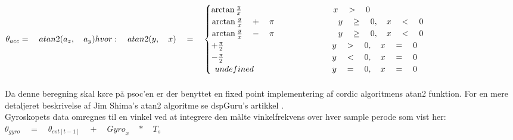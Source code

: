 	${ \theta  }_{ acc }=\quad atan2({ a }_{ z },\quad { a }_{ y })\\ \\ hvor:\quad atan2(y,\quad x)\quad =\quad \begin{cases} \begin{matrix} \arctan 
	{ \frac { y }{ x }  } \quad \quad \quad \quad \quad \quad \quad \quad \quad \quad \quad  \\ \arctan { \frac { y }{ x } \quad +\quad \pi  } \quad 
	\quad \quad \quad \quad \quad \quad  \\ \arctan { \frac { y }{ x } \quad -\quad \pi  } \quad \quad \quad \quad \quad \quad \quad  \end{matrix}
	\begin{matrix} x\quad >\quad 0\quad \quad \quad \quad \quad \quad \quad  \\ y\quad \ge \quad 0,\quad x\quad <\quad 0 \\ y\quad \ge \quad 0,\quad 
	x\quad <\quad 0 \end{matrix} \\ \begin{matrix} +\frac { \pi  }{ 2 } \quad \quad \quad \quad \quad \quad \quad \quad \quad \quad \quad \quad \quad  
	\\ -\frac { \pi  }{ 2 } \quad \quad \quad \quad \quad \quad \quad \quad \quad \quad \quad \quad \quad  \\ undefined\quad \quad \quad \quad \quad 
	\quad \quad \quad \quad  \end{matrix}\begin{matrix} y\quad >\quad 0,\quad x\quad =\quad 0 \\ y\quad <\quad 0,\quad x\quad =\quad 0 \\ y\quad 
	=\quad 0,\quad x\quad =\quad 0 \end{matrix} \end{cases}$ \\ \\
Da denne beregning skal køre på psoc'en er der benyttet en fixed point implementering af cordic algoritmens atan2 funktion. For en mere detaljeret beskrivelse af Jim Shima's atan2 algoritme se dspGuru's artikkel \citep{website:atan}. \\
Gyroskopets data omregnes til en vinkel ved at integrere den målte vinkelfrekvens over hver sample perode som vist her:\\
	${ \theta  }_{ gyro }\quad =\quad { \theta  }_{ est\left[ t-1 \right]  }\quad +\quad { Gyro }_{ x }\quad *\quad { T }_{ s }$ \\
